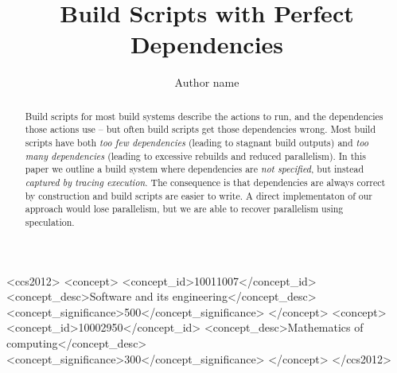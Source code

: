 \documentclass[acmsmall]{acmart}
\begin{document}
\newcommand{\Make}{\textsc{Make}\xspace}
\newcommand{\Rattle}{\textsc{Rattle}\xspace}
\newcommand{\Fabricate}{\textsc{Fabricate}\xspace}
\newcommand{\Bazel}{\textsc{Bazel}\xspace}
\newcommand{\Buck}{\textsc{Buck}\xspace}
\newcommand{\Shake}{\textsc{Shake}\xspace}
\newcommand{\libbigbro}{\textsc{libbigbro}\xspace}
\newcommand{\Fsatrace}{\textsc{Fsatrace}\xspace}
\newcommand{\tracedfs}{\textsc{Traced-Fs}\xspace}
\newcommand{\BuildXL}{\textsc{BuildXL}\xspace}
\newcommand{\Nix}{\textsc{Nix}\xspace}
\newcommand{\Memoize}{\textsc{Memoize}\xspace}


\title{Build Scripts with Perfect Dependencies}

\author{Author name}


\begin{abstract}
Build scripts for most build systems describe the actions to run, and the dependencies those actions use -- but often build scripts get those dependencies wrong.
Most build scripts have both \emph{too few dependencies} (leading to stagnant build outputs) and \emph{too many dependencies} (leading to excessive rebuilds and reduced parallelism).
In this paper we outline a build system where dependencies are \emph{not specified}, but instead \emph{captured by tracing execution}.
The consequence is that dependencies are always correct by construction and build scripts are easier to write.
A direct implementaton of our approach would lose parallelism, but we are able to recover parallelism using speculation.
\end{abstract}

\begin{CCSXML}
<ccs2012>
<concept>
<concept_id>10011007</concept_id>
 <concept_desc>Software and its engineering</concept_desc>
<concept_significance>500</concept_significance>
</concept>
<concept>
<concept_id>10002950</concept_id>
 <concept_desc>Mathematics of computing</concept_desc>
<concept_significance>300</concept_significance>
</concept>
</ccs2012>
\end{CCSXML}

\maketitle










\end{document}
